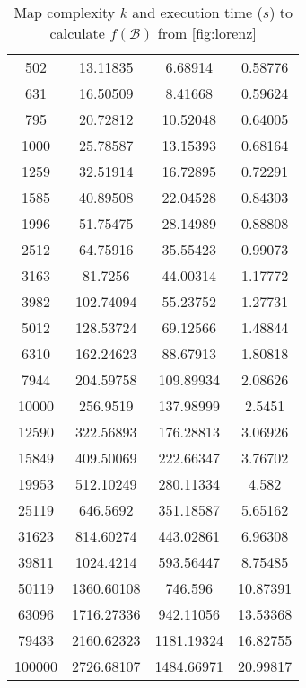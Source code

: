 \begin{table}[ht!]
{\begin{tabular}{| c | c c c |}
            502    &    13.11835    &    6.68914    &    0.58776    \\
            631    &    16.50509    &    8.41668    &    0.59624    \\
            795    &    20.72812    &    10.52048    &    0.64005    \\
            1000    &    25.78587    &    13.15393    &    0.68164    \\
            1259    &    32.51914    &    16.72895    &    0.72291    \\
            1585    &    40.89508    &    22.04528    &    0.84303    \\
            1996    &    51.75475    &    28.14989    &    0.88808    \\
            2512    &    64.75916    &    35.55423    &    0.99073    \\
            3163    &    81.7256    &    44.00314    &    1.17772    \\
            3982    &    102.74094    &    55.23752    &    1.27731    \\
            5012    &    128.53724    &    69.12566    &    1.48844    \\
            6310    &    162.24623    &    88.67913    &    1.80818    \\
            7944    &    204.59758    &    109.89934    &    2.08626    \\
            10000    &    256.9519    &    137.98999    &    2.5451    \\
            12590    &    322.56893    &    176.28813    &    3.06926    \\
            15849    &    409.50069    &    222.66347    &    3.76702    \\
            19953    &    512.10249    &    280.11334    &    4.582    \\
            25119    &    646.5692    &    351.18587    &    5.65162    \\
            31623    &    814.60274    &    443.02861    &    6.96308    \\
            39811    &    1024.4214    &    593.56447    &    8.75485    \\
            50119    &    1360.60108    &    746.596    &    10.87391    \\
            63096    &    1716.27336    &    942.11056    &    13.53368    \\
            79433    &    2160.62323    &    1181.19324    &    16.82755    \\
            100000    &    2726.68107    &    1484.66971    &    20.99817    \\
            \hline
        \end{tabular}
    }
    \caption{
        Map complexity $k$ and execution time ($s$) to calculate $f(\mathcal{B})$ from \autoref{fig:lorenz}
    }
    \label{tb:steps}
\end{table}

